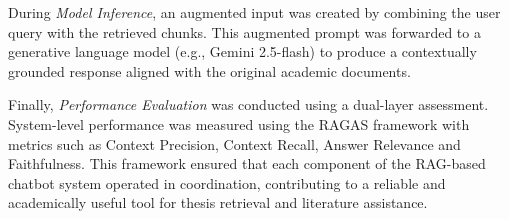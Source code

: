 \begin{refsection}
During \textit{Model Inference}, an augmented input was created by combining the user query with the retrieved chunks. This augmented prompt was forwarded to a generative language model (e.g., Gemini 2.5-flash) to produce a contextually grounded response aligned with the original academic documents.

Finally, \textit{Performance Evaluation} was conducted using a dual-layer assessment. System-level performance was measured using the RAGAS framework with metrics such as Context Precision, Context Recall, Answer Relevance and Faithfulness. This framework ensured that each component of the RAG-based chatbot system operated in coordination, contributing to a reliable and academically useful tool for thesis retrieval and literature assistance.

\clearpage

\printbibliography[heading=subbibintoc, title={\centering Notes}]
\end{refsection}
